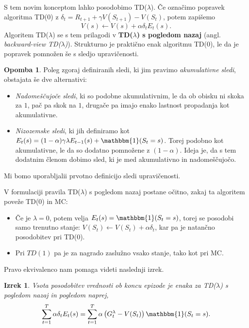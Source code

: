 \documentclass[12pt,a4paper]{amsart}
\theoremstyle{definition} %
\newtheorem{opomba}[definicija]{Opomba}
\theoremstyle{plain} %
\newtheorem{izrek}[definicija]{Izrek}
\begin{document}
S tem novim konceptom lahko posodobimo TD($\lambda$). Če označimo popravek algoritma TD($0$) z 
$\delta_t = R_{t+1} + \gamma V(S_{t+1}) - V(S_t)$, potem zapišemo
\begin{equation}\label{TDlambda}
    V(s) \leftarrow V(s) + \alpha \delta_t E_t(s).
\end{equation}
Algoritem TD($\lambda$) se s tem prilagodi v \textbf{TD($\lambda$) s pogledom nazaj} (angl. 
\textit{backward-view TD($\lambda$)}). Strukturno je praktično enak algoritmu TD($0$), le da je 
popravek pomnožen še s sledjo upravičenosti.

\begin{opomba}
    Poleg zgoraj definiranih sledi, ki jim pravimo \textit{akumulativne sledi}, obstajata še dve 
    alternativi:
    \begin{itemize}
        \item \textit{Nadomeščujoče sledi}, ki so podobne akumulativnim, le da ob obisku ni skoka za 
                $1$, pač pa skok na $1$, drugače pa imajo enako lastnost propadanja kot akumulativne. 
        \item \textit{Nizozemske sledi}, ki jih definiramo kot $E_t(s) = (1 - \alpha) \gamma \lambda 
                E_{t-1}(s) + \mathbbm{1}(S_t = s)$. Torej podobno kot akumulativne, le da so dodatno 
                pomnožene z $(1 - \alpha)$. Ideja je, da s tem dodatnim členom dobimo sled, ki je med 
                akumulativno in nadomeščujočo.
    \end{itemize}
    Mi bomo uporabljalii prvotno definicijo sledi upravičenosti. 
\end{opomba}

V formulaciji pravila TD($\lambda$) s pogledom nazaj postane očitno, zakaj ta algoritem poveže TD($0$) 
in MC:

\begin{itemize}
    \item Če je $\lambda = 0$, potem velja $E_t(s) = \mathbbm{1}(S_t = s)$, torej se posodobi samo
            trenutno stanje: $V(S_t) \leftarrow V(S_t) + \alpha \delta_t$, kar pa je natančno 
            posodobitev pri TD($0$).
    \item Pri $TD(1)$ pa je za nagrado zaslužno vsako stanje, tako kot pri MC. 
\end{itemize}
Pravo ekvivalenco nam pomaga videti naslednji izrek.

\begin{izrek}
    Vsota posodobitev vrednosti ob koncu epizode je enaka za TD($\lambda$) s pogledom nazaj in 
    pogledom naprej,
    $$
    \sum_{t=1}^T \alpha \delta_t E_t(s) = \sum_{t=1}^T \alpha \left( G_t^\lambda - V(S_t) \right) 
    \mathbbm{1}(S_t = s).
    $$
\end{izrek}
\end{document}

